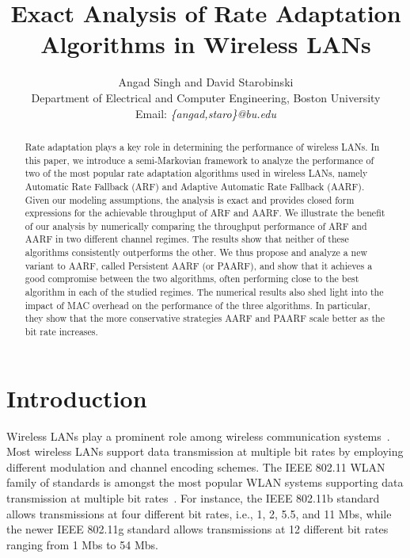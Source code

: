 \documentclass[11pt, journal, letterpaper, oneside, onecolumn]{IEEEtran}
\begin{document}
\title {Exact Analysis of Rate Adaptation Algorithms in Wireless LANs}


\author{Angad Singh and David Starobinski \\
Department of Electrical and Computer Engineering, Boston University \\
Email: {\it \{angad,staro\}@bu.edu}}




\maketitle

\thispagestyle{empty}

\begin{abstract}
Rate adaptation plays a key role in determining the performance of
wireless LANs. In this paper, we introduce a semi-Markovian
framework to analyze the performance of two of the most popular
rate adaptation algorithms used in wireless LANs, namely Automatic
Rate Fallback (ARF) and Adaptive Automatic Rate Fallback (AARF).
Given our modeling assumptions, the analysis is exact and provides
closed form expressions for the achievable throughput of ARF and
AARF. We illustrate the benefit of our analysis by numerically
comparing the throughput performance of ARF and AARF in two
different channel regimes. The results show that neither of these
algorithms consistently outperforms the other. We thus propose and
analyze a new variant to AARF, called Persistent AARF (or PAARF),
and show that it achieves a good compromise between the two
algorithms, often performing close to the best algorithm in each
of the studied regimes. The numerical results also shed light into the impact of MAC overhead on the performance of the three algorithms. In particular, they show that the more conservative strategies AARF and PAARF scale better as the bit rate increases.

\end{abstract}

\newpage

\setcounter{page}{1} 

\section {Introduction}

Wireless LANs play a prominent role among wireless communication
systems~\cite{haastelecomm,ieee:80211,masked}. Most
wireless LANs support data transmission at multiple bit rates by
employing different modulation and channel encoding schemes. The
IEEE 802.11 WLAN family of standards is amongst the most popular
WLAN systems supporting data transmission at multiple
bit rates~\cite{ieee:80211,staro}. For instance, the IEEE 802.11b
standard allows transmissions at four different bit rates, i.e.,
1, 2, 5.5, and 11 Mbs, while the newer IEEE 802.11g standard
allows transmissions at 12 different bit rates ranging from 1 Mbs
to 54 Mbs.
\end{document}
